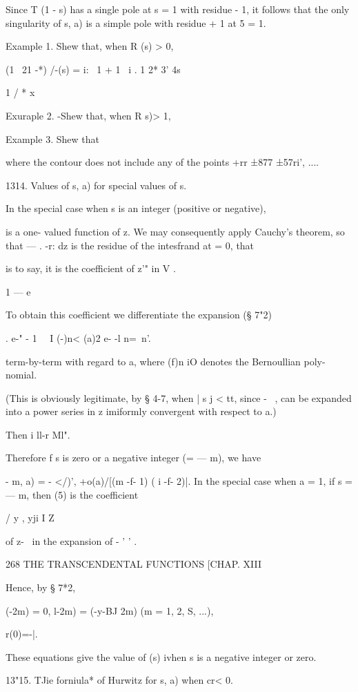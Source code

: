 Since T (1 - s) has a single pole at s = 1 with residue - 1, it
follows that the only singularity of s, a) is a simple pole with
residue + 1 at 5 = 1.

Example 1. Shew that, when R (s) > 0,

(1 \ 21 -*) /-(s) = i: \ 1 + 1 \ i . 1 2* 3' 4s ~

1 / * x ~

Exuraple 2. -Shew that, when R s)> 1,

Example 3. Shew that

where the contour does not include any of the points +rr ±877 ±57ri',
....

1314. Values of s, a) for special values of s.

In the special case when s is an integer (positive or negative),

is a one- valued function of z. We may consequently apply Cauchy's
theorem, so that — . -r: dz is the residue of the intesfrand at = 0,
that

is to say, it is the coefficient of z'" in V .

1 — e~

To obtain this coefficient we differentiate the expansion (§ 7"2)

. e-" - 1 \ \ I (-)n< (a)2 e- -l n=\ n'.

term-by-term with regard to a, where (f)n iO denotes the Bernoullian
poly- nomial.

(This is obviously legitimate, by § 4-7, when | s j < tt, since - \ ,
can be expanded into a power series in z imiformly convergent with
respect to a.)

Then i ll-r Ml".

Therefore f s is zero or a negative integer (= — m), we have

  - m, a) = - </)', +o(a)/[(m -f- 1) ( i -f- 2)|. In the special case
when a = 1, if s = — m, then (5) is the coefficient

/ y , yji I Z

of z-~ in the expansion of - ' ' .

268 THE TRANSCENDENTAL FUNCTIONS [CHAP. XIII

Hence, by § 7*2,

 (-2m) = 0, l-2m) = (-y-BJ 2m) (m = 1, 2, S, ...),

r(0)=-|.

These equations give the value of (s) ivhen s is a negative integer or
zero.

13"15. TJie forniula* of Hurwitz for s, a) when cr< 0.


